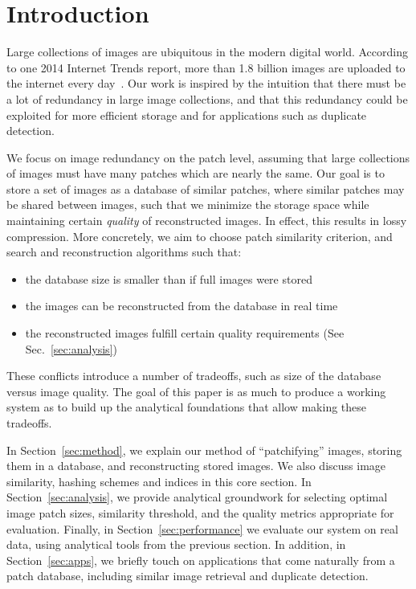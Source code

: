 \section{Introduction}

Large collections of images are ubiquitous in the modern digital world.
According to one 2014 Internet Trends report,
more than 1.8 billion images are uploaded to the internet every day~\cite{meeker2014internet}.
Our work is inspired by the intuition that there must be a lot of redundancy
in large image collections, and that this redundancy could
be exploited for more efficient storage and for applications such as duplicate detection.

We focus on image redundancy on the patch level, assuming that large collections
of images must have many patches which are nearly the same.
Our goal is to store a set of images as a database of
similar patches, where similar patches may be shared between images,
 such that we minimize the storage space while maintaining certain \emph{quality}
of reconstructed images. In effect, this results in lossy compression. More concretely,
we aim to choose patch similarity criterion, and search and reconstruction algorithms such
that:
\begin{itemize}
\item the database size is smaller than if full images were stored
\item the images can be reconstructed from the database in real time
\item the reconstructed images fulfill certain quality requirements (See Sec.~\ref{sec:analysis})
\end{itemize}
These conflicts introduce a number of tradeoffs, such as size of
the database versus image quality.
The goal of this paper is as much to produce a working system as to
build up the analytical foundations that allow making these tradeoffs.

In Section~\ref{sec:method}, we explain our method of ``patchifying'' images,
storing them in a database, and reconstructing stored images. We also
discuss image similarity, hashing schemes and indices in this core section.
In Section~\ref{sec:analysis}, we provide analytical groundwork for
selecting optimal image patch sizes, similarity threshold, and the quality metrics
appropriate for evaluation. Finally, in Section~\ref{sec:performance}
we evaluate our system on real data, using analytical tools from the previous section.
In addition, in Section~\ref{sec:apps}, we briefly touch on applications that come naturally
from a patch database, including similar image retrieval and duplicate detection.
